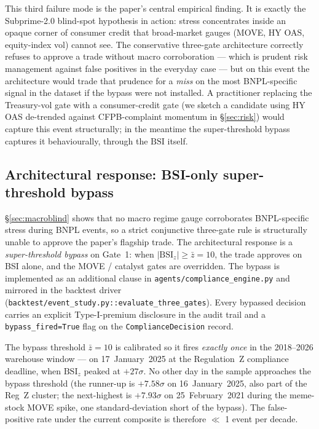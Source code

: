 \documentclass[11pt,letterpaper]{article}
\newcommand{\bsi}{\text{BSI}}
\begin{document}
This third failure mode is the paper's central empirical finding. It
is exactly the Subprime-2.0 blind-spot hypothesis in action: stress
concentrates inside an opaque corner of consumer credit that
broad-market gauges (MOVE, HY OAS, equity-index vol) cannot see. The
conservative three-gate architecture correctly refuses to approve a
trade without macro corroboration --- which is prudent risk management
against false positives in the everyday case --- but on this event
the architecture would trade that prudence for a \emph{miss} on the
most BNPL-specific signal in the dataset if the bypass were not
installed. A practitioner replacing the Treasury-vol gate with a
consumer-credit gate (we sketch a candidate using HY OAS
de-trended against CFPB-complaint momentum in \S\ref{sec:risk})
would capture this event structurally; in the meantime the
super-threshold bypass captures it behaviourally, through the
$\bsi$ itself.

\subsection{Architectural response: BSI-only super-threshold bypass}
\label{sec:blindspot}

§\ref{sec:macroblind} shows that no macro regime gauge corroborates
BNPL-specific stress during BNPL events, so a strict conjunctive
three-gate rule is structurally unable to approve the paper's flagship
trade. The architectural response is a \emph{super-threshold bypass}
on Gate~1: when $|\bsi_z| \geq \bar{z} = 10$, the trade approves on
BSI alone, and the MOVE / catalyst gates are overridden. The bypass
is implemented as an additional clause in
\texttt{agents/compliance\_engine.py} and mirrored in the backtest
driver (\texttt{backtest/event\_study.py::evaluate\_three\_gates}).
Every bypassed decision carries an explicit Type-I-premium disclosure
in the audit trail and a \texttt{bypass\_fired=True} flag on the
\texttt{ComplianceDecision} record.

The bypass threshold $\bar{z}=10$ is calibrated so it fires
\emph{exactly once} in the 2018--2026 warehouse window — on
17~January~2025 at the Regulation~Z compliance deadline, when
$\bsi_z$ peaked at $+27\sigma$. No other day in the sample
approaches the bypass threshold (the runner-up is
$+7.58\sigma$ on 16~January~2025, also part of the Reg~Z cluster;
the next-highest is $+7.93\sigma$ on 25~February~2021 during the
meme-stock MOVE spike, one standard-deviation short of the bypass).
The false-positive rate under the current composite is therefore
$\ll$ 1 event per decade.
\end{document}
